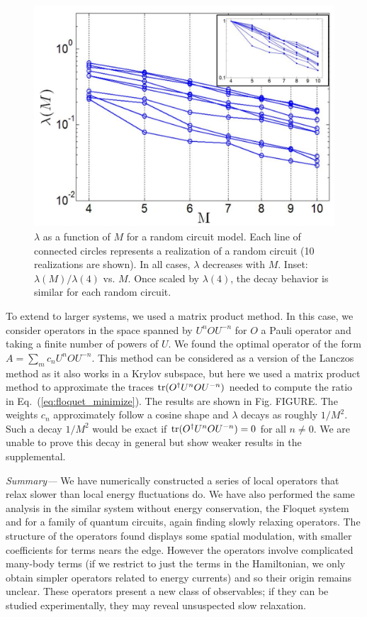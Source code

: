 \documentclass[twocolumn,superscriptaddress, prb]{revtex4-1}
\begin{document}
\begin{figure}
\includegraphics[width=1.0\linewidth]{random_circuit.pdf}
\centering
\caption{$\lambda$ as a function of $M$ for a random circuit model. Each line of connected circles represents a realization of a random circuit (10 realizations are shown). In all cases, $\lambda$ decreases with $M$. Inset: $\lambda(M)/\lambda(4)$ vs. $M$. Once scaled by $\lambda(4)$, the decay behavior is similar for each random circuit. }
\label{fig:lz}
\end{figure}

To extend to larger systems, we used a matrix product method.  In this case, we consider operators in the space spanned by $U^n O U^{-n}$ for $O$ a Pauli operator and taking a finite number of powers of $U$.  We found the optimal operator of the form $A=\sum_m c_n U^n O U^{-n}$.  This method can be considered as a version of the Lanczos method as it also works in a Krylov subspace, but here we used a matrix product method to approximate the traces ${\rm tr}(O^\dagger U^n O U^{-n})$ needed to compute the ratio in Eq.~(\ref{eq:floquet_minimize}).
The results are shown in Fig. FIGURE.
The weights $c_n$ approximately follow a cosine shape and $\lambda$ decays as roughly $1/M^2$.  Such a decay $1/M^2$ would be exact if
${\rm tr}(O^\dagger U^n O U^{-n})=0$ for all $n \neq 0$.
 We are unable to prove this decay in general but show weaker results in the supplemental.

{\it Summary---}
We have numerically constructed a series of local operators that relax slower than local energy fluctuations do.
We have also performed the same analysis in the similar system without energy conservation,
the Floquet system and for a family of quantum circuits, again finding slowly relaxing operators.
The structure of the operators found displays some spatial modulation, with smaller coefficients for terms nears the edge.  However the operators involve complicated many-body terms (if we restrict to just the terms in the Hamiltonian, we only obtain simpler operators related to energy currents) and so their origin remains unclear.
These operators present a new class of observables; if they can be studied experimentally, they may reveal unsuspected slow relaxation.
\end{document}
